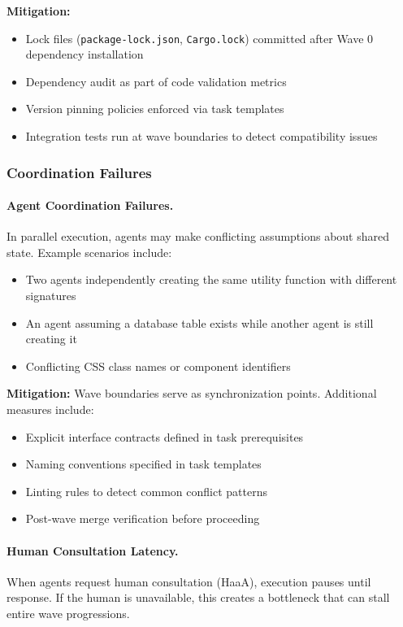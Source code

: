 \textbf{Mitigation:}
\begin{itemize}
    \item Lock files (\texttt{package-lock.json}, \texttt{Cargo.lock}) committed
    after Wave 0 dependency installation
    \item Dependency audit as part of code validation metrics
    \item Version pinning policies enforced via task templates
    \item Integration tests run at wave boundaries to detect compatibility issues
\end{itemize}

\needspace{4cm}
\subsubsection{Coordination Failures}
\label{subsubsec:coordination-detail}

\paragraph{Agent Coordination Failures.}
In parallel execution, agents may make conflicting assumptions about shared
state. Example scenarios include:
\begin{itemize}
    \item Two agents independently creating the same utility function with
    different signatures
    \item An agent assuming a database table exists while another agent is
    still creating it
    \item Conflicting CSS class names or component identifiers
\end{itemize}

\textbf{Mitigation:} Wave boundaries serve as synchronization points.
Additional measures include:
\begin{itemize}
    \item Explicit interface contracts defined in task prerequisites
    \item Naming conventions specified in task templates
    \item Linting rules to detect common conflict patterns
    \item Post-wave merge verification before proceeding
\end{itemize}

\paragraph{Human Consultation Latency.}
When agents request human consultation (HaaA), execution pauses until
response. If the human is unavailable, this creates a bottleneck that
can stall entire wave progressions.

